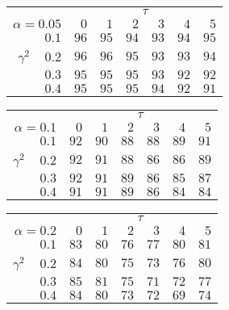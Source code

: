 \begin{tabular}{r|rrrrrr}
\hline\hline
 &\multicolumn{6}{c}{$\tau$} \\ 
 $\alpha = 0.05$ & $0$ & $1$ & $2$ & $3$ & $4$ & $5$ \\ 
 \hline$0.1$ & $96$ & $95$ & $94$ & $93$ & $94$ & $95$\\ 
$\gamma^2\;\;\;$ $0.2$ & $96$ & $96$ & $95$ & $93$ & $93$ & $94$\\ 
$0.3$ & $95$ & $95$ & $95$ & $93$ & $92$ & $92$\\ 
$0.4$ & $95$ & $95$ & $95$ & $94$ & $92$ & $91$\\ 
 \hline 
 \end{tabular}
 
 \vspace{2em} 
 
\begin{tabular}{r|rrrrrr}
\hline\hline
 &\multicolumn{6}{c}{$\tau$} \\ 
 $\alpha = 0.1$ & $0$ & $1$ & $2$ & $3$ & $4$ & $5$ \\ 
 \hline$0.1$ & $92$ & $90$ & $88$ & $88$ & $89$ & $91$\\ 
$\gamma^2\;\;\;$ $0.2$ & $92$ & $91$ & $88$ & $86$ & $86$ & $89$\\ 
$0.3$ & $92$ & $91$ & $89$ & $86$ & $85$ & $87$\\ 
$0.4$ & $91$ & $91$ & $89$ & $86$ & $84$ & $84$\\ 
 \hline 
 \end{tabular}
 
 \vspace{2em} 
 
\begin{tabular}{r|rrrrrr}
\hline\hline
 &\multicolumn{6}{c}{$\tau$} \\ 
 $\alpha = 0.2$ & $0$ & $1$ & $2$ & $3$ & $4$ & $5$ \\ 
 \hline$0.1$ & $83$ & $80$ & $76$ & $77$ & $80$ & $81$\\ 
$\gamma^2\;\;\;$ $0.2$ & $84$ & $80$ & $75$ & $73$ & $76$ & $80$\\ 
$0.3$ & $85$ & $81$ & $75$ & $71$ & $72$ & $77$\\ 
$0.4$ & $84$ & $80$ & $73$ & $72$ & $69$ & $74$\\ 
 \hline 
 \end{tabular}